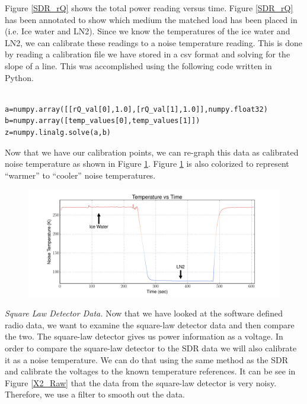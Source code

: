 Figure \ref{SDR_rQ} shows the total power reading versus time.  Figure \ref{SDR_rQ} has been annotated to show which medium the matched load has been placed in (i.e. Ice water and LN2).  Since we know the temperatures of the ice water and LN2, we can calibrate these readings to a noise temperature reading.  This is done by reading a calibration file we have stored in a csv format and solving for the slope of a line.  This was accomplished using the following code written in Python.
\ \\ \ \\
\begin{minipage}{\linewidth}
\lstset{language=Python}
\begin{lstlisting}[frame=single,keywordstyle=\color{blue}]
a=numpy.array([[rQ_val[0],1.0],[rQ_val[1],1.0]],numpy.float32)
b=numpy.array([temp_values[0],temp_values[1]])
z=numpy.linalg.solve(a,b)
\end{lstlisting}
\end{minipage}

Now that we have our calibration points, we can re-graph this data as calibrated noise temperature as shown in Figure \ref{SDR_Calibrated}.  Figure \ref{SDR_Calibrated} is also colorized to represent ``warmer'' to ``cooler'' noise temperatures.

\begin{figure}[h!tb] \centering

\includegraphics[width=\textwidth]{Experiments/Exp1/sdr_calibrated_color.pdf}

\label{SDR_Calibrated}
\end{figure}

\emph{Square Law Detector Data.}  Now that we have looked at the software defined radio data, we want to examine the square-law detector data and then compare the two.  The square-law detector gives us power information as a voltage.  In order to compare the square-law detector to the SDR data we will also calibrate it as a noise temperature.  We can do that using the same method as the SDR and calibrate the voltages to the known temperature references.  It can be see in Figure \ref{X2_Raw} that the data from the square-law detector is very noisy.  Therefore, we use a filter to smooth out the data.

